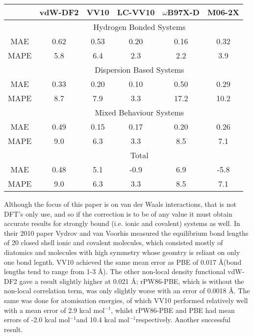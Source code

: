 \documentclass[10pt,a4paper,twocolumn,twoside]{extarticle}
\newcommand{\kcal}{kcal mol\(^{-1}\)}
\newcommand{\oA}{\si{\angstrom}}
\begin{document}
	\begin{table*}
		\centering
		\begin{tabular}[]{c|c c c c c}
			& vdW-DF2 & VV10 & LC-VV10 & $\omega$B97X-D & M06-2X\\
			\hline
			& \multicolumn{5}{c}{Hydrogen Bonded Systems}\\
			MAE & 0.62 & 0.53 & 0.20 & 0.16 & 0.32\\
			MAPE & 5.8 & 6.4 & 2.3 & 2.2 & 3.9\\
			& \multicolumn{5}{c}{Dispersion Based Systems}\\
			MAE & 0.33 & 0.20 & 0.10 & 0.50 & 0.29\\
			MAPE & 8.7 & 7.9 & 3.3 & 17.2 & 10.2\\
			& \multicolumn{5}{c}{Mixed Behaviour Systems}\\
			MAE & 0.49 & 0.15 & 0.17 & 0.20 & 0.26\\
			MAPE & 9.0 & 6.3 & 3.3 & 8.5 & 7.1\\
			& \multicolumn{5}{c}{Total}\\
			MAE & 0.48 & 5.1 & -0.9 & 6.9 & -5.8\\
			MAPE & 9.0 & 6.3 & 3.3 & 8.5 & 7.1\\
		\end{tabular}
		\caption{Errors of the binding energy at equilibrium distance for the functionals benchmarked against the S66 test set for weakly bounded systems in references \cite{Vydrov2012}, where MAE is the mean absolute error in \kcal and MAPE is the mean absolute percentage error. }
		\label{tab:VV10S66}
	\end{table*}

	Although the focus of this paper is on van der Waals interactions, that is not DFT's only use, and so if the correction is to be of any value it must obtain accurate results for strongly bound (i.e. ionic and covalent) systems as well. In their 2010 paper Vydrov and van Voorhis\cite{Vydrov2010} measured the equilibrium bond lengths\cite{physvals} of 20 closed shell ionic and covalent molecules, which consisted mostly of diatomics and molecules with high symmetry whose geomtry is reliant on only one bond legnth. VV10 achieved the same mean error as PBE of 0.017 \oA (bond lengths tend to range from 1-3 \oA). The other non-local density functional vdW-DF2 gave a result slightly higher at 0.021 \oA; rPW86-PBE, which is without the non-local correlation term, was only slightly worse with an error of 0.0018 \oA. The same was done for atomisation energies\cite{atomisationvals}, of which VV10 performed relatively well with a mean error of 2.9 \kcal, whilst rPW86-PBE and PBE had mean errors of -2.0 \kcal and 10.4 \kcal respectively. Another successful result. 
\end{document}
